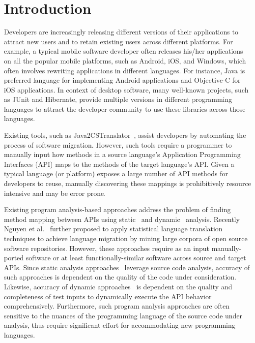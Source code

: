 \section{Introduction}
\label{sec:introduction}


Developers are increasingly releasing different versions of their applications to attract new users and to retain existing users across different platforms.
For example, a typical mobile software developer often releases his/her applications
on all the popular mobile platforms, such as Android, iOS, and Windows,
which often involves rewriting applications in different languages.
For instance, Java is preferred language for implementing Android applications
and Objective-C for iOS applications.
In context of desktop software, many well-known projects, such as JUnit and
Hibernate, provide multiple versions in different programming languages
to attract the developer community to use these
libraries across those languages.



Existing tools, such as Java2CSTranslator~\cite{java2cstranslator},
assist developers by automating the process of software migration.
However, such tools require a programmer to manually input
how methods in a source language's Application Programming Interfaces (API) maps to the methods of the target language's API. 
Given a typical language (or platform) exposes a large number of API methods for developers to reuse, manually discovering these mappings is prohibitively resource intensive and may be error prone.


Existing program analysis-based approaches
address the problem of finding method mapping between APIs using
static~\cite{Zhong2010ICSE} and dynamic~\cite{Gokhale2013ICSE} analysis. 
Recently Nguyen et al.~\cite{nguyen2014statistical} further proposed to
apply statistical language translation techniques to achieve language migration
by mining large corpora of open source software repositories.
However, these approaches require as an input manually-ported software
or at least functionally-similar software across source and target APIs.
Since static analysis approaches~\cite{Zhong2010ICSE,nguyen2014statistical}
leverage source code analysis, 
accuracy of such approaches is dependent on the quality of the code under consideration.
Likewise, accuracy of dynamic approaches~\cite{Gokhale2013ICSE} is dependent on
the quality and completeness of test inputs
to dynamically execute the API behavior comprehensively. 
Furthermore, such program analysis approaches are often sensitive to the nuances of
the programming language of the source code under analysis, thus require significant effort
for accommodating new programming languages.  


